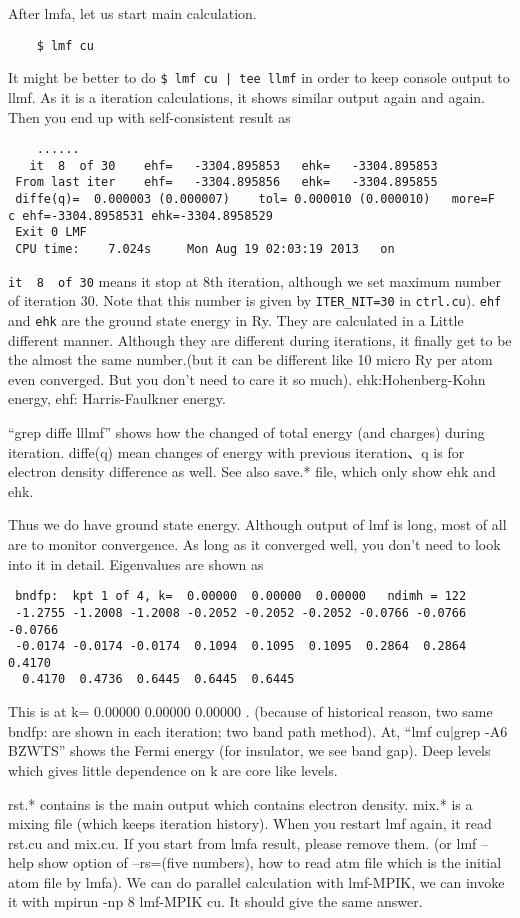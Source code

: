 \documentclass[a4paper,10pt,epsf,fleqn]{article}
\begin{document}
After lmfa, let us start main calculation.
\begin{verbatim}
    $ lmf cu
\end{verbatim}
It might be better to do
\verb+$ lmf cu | tee llmf+
in order to keep console output to llmf. 
As it is a iteration calculations, 
it shows similar output again and again.
Then you end up with self-consistent result as
\begin{verbatim}
    ......
   it  8  of 30    ehf=   -3304.895853   ehk=   -3304.895853
 From last iter    ehf=   -3304.895856   ehk=   -3304.895855
 diffe(q)=  0.000003 (0.000007)    tol= 0.000010 (0.000010)   more=F
c ehf=-3304.8958531 ehk=-3304.8958529
 Exit 0 LMF 
 CPU time:    7.024s     Mon Aug 19 02:03:19 2013   on  
\end{verbatim}
\verb+it  8  of 30+ means it stop at 8th iteration, although we set
maximum number of iteration 30. Note that this number is 
given by \verb+ITER_NIT=30+ in \verb+ctrl.cu+).
\verb+ehf+ and \verb+ehk+ are the ground state energy in Ry.
They are calculated in a Little different manner. Although
they are different during iterations, it finally get to be the
almost the same number.(but it can be different like 10 micro Ry per atom
even converged. But you don't need to care it so much).
ehk:Hohenberg-Kohn energy, ehf: Harris-Faulkner energy.

``grep diffe lllmf'' shows how the changed of total energy (and charges)
during iteration. diffe(q) mean  changes of energy with previous
iteration、q is for electron density difference as well.
See also save.* file, which only show ehk and ehk.

Thus we do have ground state energy.
Although output of lmf is long, most of all are to monitor
convergence.
As long as it converged well, you don't need to look into it in detail.
Eigenvalues are shown as
\begin{verbatim}
 bndfp:  kpt 1 of 4, k=  0.00000  0.00000  0.00000   ndimh = 122
 -1.2755 -1.2008 -1.2008 -0.2052 -0.2052 -0.2052 -0.0766 -0.0766 -0.0766
 -0.0174 -0.0174 -0.0174  0.1094  0.1095  0.1095  0.2864  0.2864  0.4170
  0.4170  0.4736  0.6445  0.6445  0.6445
\end{verbatim}
This is at k=  0.00000  0.00000  0.00000 .
(because of historical reason, two same bndfp: are shown in each
iteration; two band path method). At,  ``lmf cu|grep -A6 BZWTS'' shows the Fermi energy
(for insulator, we see band gap). 
Deep levels which gives little dependence on k are core like levels.

rst.* contains is the main output which contains electron density.
mix.* is a mixing file (which keeps iteration history).
When you restart lmf again, it read rst.cu and mix.cu.
If you start from lmfa result, please remove them.
(or lmf --help show option of --rs=(five numbers), 
how to read atm file which is the initial atom file by lmfa).
We can do parallel calculation with lmf-MPIK, 
we can invoke it with mpirun -np 8 lmf-MPIK cu. It should give the
same answer.
\end{document}
